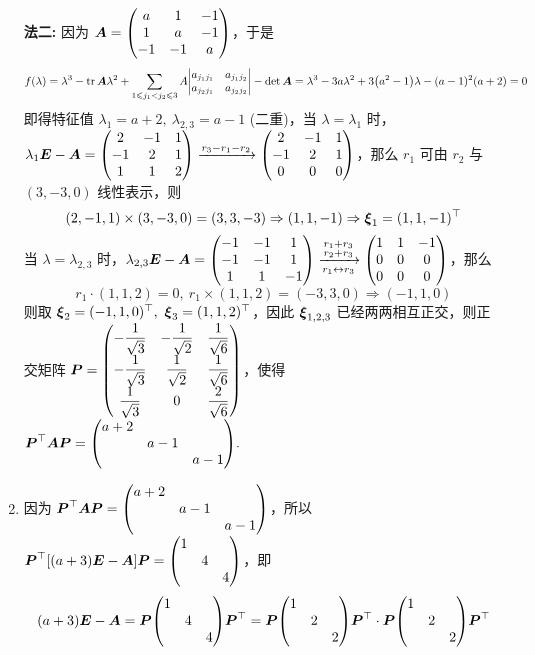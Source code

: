 \begin{solution}
\begin{enumerate}[label=(\arabic{*})]
        \textbf{法二: }因为 $\vb*{A}=\mqty(a&1&-1\\1&a&-1\\-1&-1&a)$，于是 
        $$f(\lambda)=\lambda^3-\tr\vb*{A}\lambda^2+\sum_{1\leqslant j_1<j_2\leqslant 3}A\mqty|a_{j_1j_1}&a_{j_1j_2}\\a_{j_2j_1}&a_{j_2j_2}|-\det\vb*{A}=\lambda^3-3a\lambda^2+3\qty(a^2-1)\lambda-(a-1)^2(a+2)=0$$
        即得特征值 $\lambda_1=a+2,~\lambda_{2,3}=a-1$ (二重)，当 $\lambda=\lambda_1$ 时，$\lambda_1\vb*{E}-\vb*{A}=\mqty(2&-1&1\\-1&2&1\\1&1&2)\xrightarrow{r_3-r_1-r_2}\mqty(2&-1&1\\-1&2&1\\0&0&0)$，那么 $r_1$ 可由 $r_2$ 与 $(3,-3,0)$ 线性表示，则
        $$(2,-1,1)\times(3,-3,0)=(3,3,-3)\Rightarrow (1,1,-1)\Rightarrow \vb*{\xi}_1=(1,1,-1)^\top$$
        当 $\lambda=\lambda_{2,3}$ 时，$\lambda_{2,3}\vb*{E}-\vb*{A}=\mqty(-1&-1&1\\-1&-1&1\\1&1&-1)\xrightarrow[r_1\leftrightarrow r_3]{\substack{r_1+r_3\\r_2+r_3}}\mqty(1&1&-1\\0&0&0\\0&0&0)$，那么 $$r_1\cdot (1,1,2)=0,~r_1\times(1,1,2)=(-3,3,0)\Rightarrow(-1,1,0)$$
        则取 $\vb*{\xi}_2=(-1,1,0)^\top,~\vb*{\xi}_3=(1,1,2)^\top$，因此 $\vb*{\xi}_{1,2,3}$ 已经两两相互正交，则正交矩阵 $\vb*{P}=\mqty(-\dfrac{1}{\sqrt{3}}&-\dfrac{1}{\sqrt{2}}&\dfrac{1}{\sqrt{6}}\\[6pt]-\dfrac{1}{\sqrt{3}}&\dfrac{1}{\sqrt{2}}&\dfrac{1}{\sqrt{6}}\\[6pt]\dfrac{1}{\sqrt{3}}&0&\dfrac{2}{\sqrt{6}})$，使得 $\vb*{P}^\top\vb*{AP}=\mqty(a+2\\&a-1\\&&a-1).$
        \item 因为 $\vb*{P}^\top\vb*{AP}=\mqty(a+2\\&a-1\\&&a-1)$，所以 $\vb*{P}^\top\qty[(a+3)\vb*{E}-\vb*{A}]\vb*{P}=\mqty(1\\&4\\&&4)$，即 
        $$(a+3)\vb*{E}-\vb*{A}=\vb*{P}\mqty(1\\&4\\&&4)\vb*{P}^\top=\vb*{P}\mqty(1\\&2\\&&2)\vb*{P}^\top\cdot\vb*{P}\mqty(1\\&2\\&&2)\vb*{P}^\top$$

\end{enumerate}
\end{solution}
